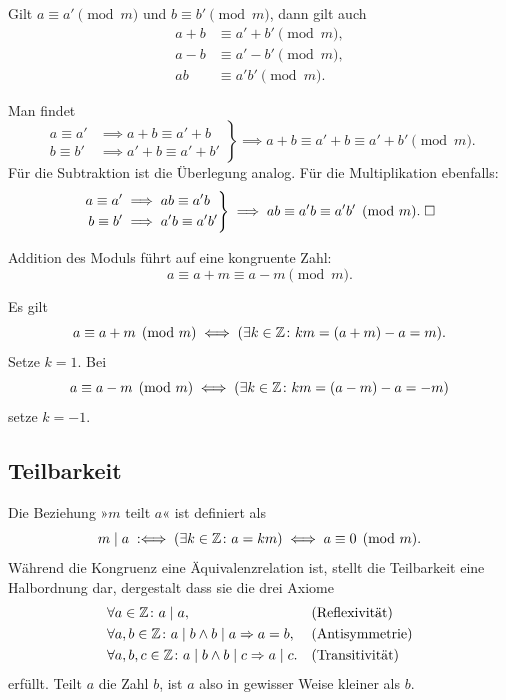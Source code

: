 \begin{Satz}
Gilt $a\equiv a'\pmod{m}$ und
$b\equiv b'\pmod{m}$, dann gilt auch
\begin{align*}
a+b&\equiv a'+b'\pmod{m},\\
a-b&\equiv a'-b'\pmod{m},\\
ab&\equiv a'b'\pmod{m}.
\end{align*}
\end{Satz}
 Man findet
\[\left.\begin{aligned}
a\equiv a'&\implies a+b\equiv a'+b\\
b\equiv b'&\implies a'+b\equiv a'+b'
\end{aligned}\right\}
\implies a+b\equiv a'+b\equiv a'+b'\pmod{m}.\]
Für die Subtraktion ist die Überlegung analog. Für die Multiplikation
ebenfalls:%
\[\left.\begin{aligned}
a\equiv a'&\implies ab\equiv a'b\\
b\equiv b'&\implies a'b\equiv a'b'
\end{aligned}\right\}
\implies ab\equiv a'b\equiv a'b'\pmod{m}.\;\Box\]

\begin{Satz}
Addition des Moduls führt auf eine kongruente Zahl:%
\[a\equiv a+m\equiv a-m\pmod{m}.\]
\end{Satz}
\begin{Beweis}
Es gilt
\[a\equiv a+m\pmod{m}\iff (\exists k\in\mathbb Z\colon km=(a+m)-a=m).\]
Setze $k=1$. Bei
\[a\equiv a-m\pmod{m}\iff (\exists k\in\mathbb Z\colon km=(a-m)-a=-m)\]
setze $k=-1$.\;\qedsymbol
\end{Beweis}

\subsection{Teilbarkeit}

Die Beziehung »$m$ teilt $a$« ist definiert als
\[m\mid a\;:\Longleftrightarrow\; (\exists k\in\mathbb Z\colon a=km) \iff a\equiv 0\pmod{m}.\]
Während die Kongruenz eine Äquivalenzrelation ist, stellt die
Teilbarkeit eine Halbordnung dar, dergestalt dass sie die drei Axiome
\begin{align*}
&\forall a\in\mathbb Z\colon a\mid a, &&\text{(Reflexivität)}\\
&\forall a,b\in\mathbb Z\colon a\mid b\land b\mid a\Rightarrow a = b,&&\text{(Antisymmetrie)}\\
&\forall a,b,c\in\mathbb Z\colon a\mid b\land b\mid c\Rightarrow a\mid c.&&\text{(Transitivität)}
\end{align*}
erfüllt. Teilt $a$ die Zahl $b$, ist $a$ also in gewisser Weise kleiner
als $b$.

